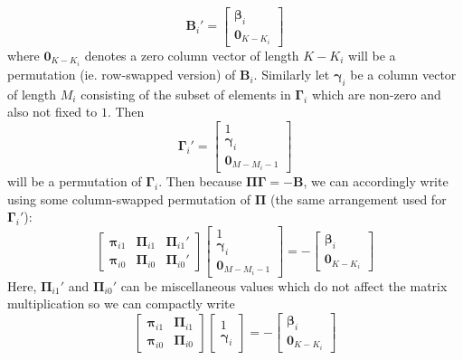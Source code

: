 \documentclass[11pt]{report} %
\begin{document}
\begin{equation}
\mathbf{B}_{i}' = \begin{bmatrix} \boldsymbol{\beta}_{i} \\ \mathbf{0}_{K - K_{i}} \end{bmatrix}
\end{equation}
where $\mathbf{0}_{K - K_{i}}$ denotes a zero column vector of length $K - K_{i}$ will be a permutation (ie. row-swapped version) of $\mathbf{B}_{i}$. Similarly let $\boldsymbol{\gamma}_{i}$ be a column vector of length $M_{i}$ consisting of the subset of elements in $\boldsymbol{\Gamma}_{i}$ which are non-zero and also not fixed to $1$. Then
\begin{equation}
\boldsymbol{\Gamma}_{i}' = \begin{bmatrix} 1 \\ \boldsymbol{\gamma}_{i} \\ \mathbf{0}_{M - M_{i} - 1} \end{bmatrix}
\end{equation}
will be a permutation of $\boldsymbol{\Gamma}_{i}$. Then because $\boldsymbol{\Pi}\boldsymbol{\Gamma} = -\mathbf{B}$, we can accordingly write using some column-swapped permutation of $\boldsymbol{\Pi}$ (the same arrangement used for $\boldsymbol{\Gamma}_{i}'$):
\begin{equation}
\begin{bmatrix}
\boldsymbol{\pi}_{i1} & \boldsymbol{\Pi}_{i1} & \boldsymbol{\Pi}_{i1}' \\
\boldsymbol{\pi}_{i0} & \boldsymbol{\Pi}_{i0} & \boldsymbol{\Pi}_{i0}'
\end{bmatrix}\begin{bmatrix} 1 \\ \boldsymbol{\gamma}_{i} \\ \mathbf{0}_{M - M_{i} - 1} \end{bmatrix} = -\begin{bmatrix} \boldsymbol{\beta}_{i} \\ \mathbf{0}_{K - K_{i}} \end{bmatrix}
\end{equation}
Here, $\boldsymbol{\Pi}_{i1}'$ and $\boldsymbol{\Pi}_{i0}'$ can be miscellaneous values which do not affect the matrix multiplication so we can compactly write
\begin{equation}
\begin{bmatrix}
\boldsymbol{\pi}_{i1} & \boldsymbol{\Pi}_{i1}  \\
\boldsymbol{\pi}_{i0} & \boldsymbol{\Pi}_{i0} 
\end{bmatrix}\begin{bmatrix} 1 \\ \boldsymbol{\gamma}_{i}\end{bmatrix} = -\begin{bmatrix} \boldsymbol{\beta}_{i} \\ \mathbf{0}_{K - K_{i}} \end{bmatrix}
\end{equation}
\end{document}
